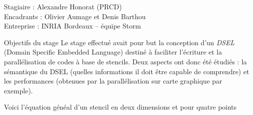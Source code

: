 \documentclass[a4paper]{article}
\newcommand{\intern}{Alexandre Honorat (PRCD)}
\newcommand{\tutor}{Olivier Aumage et Denis Barthou}
\newcommand{\companyname}{INRIA Bordeaux -- équipe Storm}
\begin{document}
\begin{center}

\vspace*{0.5cm}

  {\large Stagiaire : \intern}\\
  {\large Encadrants : \tutor}\\
  {\large Entreprise : \companyname}

\vspace{1cm}

\begin{bclogo}[couleur=black!10,couleurBord=black!50,arrondi=0.1,logo=\hspace{17pt},barre=none]{Objectifs du stage}
Le stage effectué avait pour but la conception d'un \emph{DSEL} (Domain Specific Embedded Language) destiné à faciliter l'écriture et la parallélisation de codes à base de stencils. Deux aspects ont donc été étudiés : la sémantique du DSEL (quelles informations il doit être capable de comprendre) et les performances (obtenues par la parallélisation sur carte graphique par exemple).

Voici l'équation généal d'un stencil en deux dimensions et pour quatre points 
\end{bclogo}

\end{center}
\end{document}
